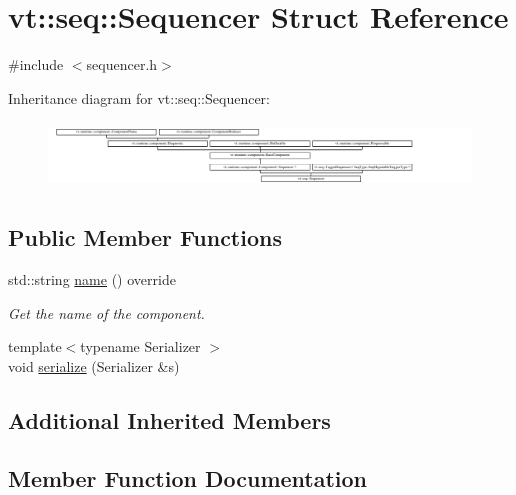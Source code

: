 \hypertarget{structvt_1_1seq_1_1_sequencer}{}\section{vt\+:\+:seq\+:\+:Sequencer Struct Reference}
\label{structvt_1_1seq_1_1_sequencer}


{\ttfamily \#include $<$sequencer.\+h$>$}

Inheritance diagram for vt\+:\+:seq\+:\+:Sequencer\+:\begin{figure}[H]
\begin{center}
\leavevmode
\includegraphics[height=1.767677cm]{structvt_1_1seq_1_1_sequencer}
\end{center}
\end{figure}
\subsection*{Public Member Functions}
\begin{DoxyCompactItemize}
\item 
std\+::string \hyperlink{structvt_1_1seq_1_1_sequencer_a18cbaabd9f1c5bf8d2f6a5c2e4ac5aaa}{name} () override
\begin{DoxyCompactList}\small\item\em Get the name of the component. \end{DoxyCompactList}\item 
{\footnotesize template$<$typename Serializer $>$ }\\void \hyperlink{structvt_1_1seq_1_1_sequencer_a577f04952123547c3d8c8b3d28cf19ef}{serialize} (Serializer \&s)
\end{DoxyCompactItemize}
\subsection*{Additional Inherited Members}


\subsection{Member Function Documentation}
\mbox{\label{structvt_1_1seq_1_1_sequencer_a18cbaabd9f1c5bf8d2f6a5c2e4ac5aaa}} 
